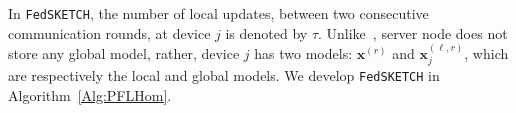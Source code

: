 \documentclass{article}
\begin{document}
In \texttt{FedSKETCH}, the number of local updates, between two consecutive communication rounds, at device $j$ is denoted by $\tau$.
 Unlike~\citet{haddadpour2020federated}, server node does not store any global model, rather, device $j$ has two models: $\boldsymbol{x}^{(r)}$ and $\boldsymbol{x}^{(\ell,r)}_j$, which are respectively the local and global models. 
%
We develop \texttt{FedSKETCH} in Algorithm~\ref{Alg:PFLHom}. 
\end{document}
